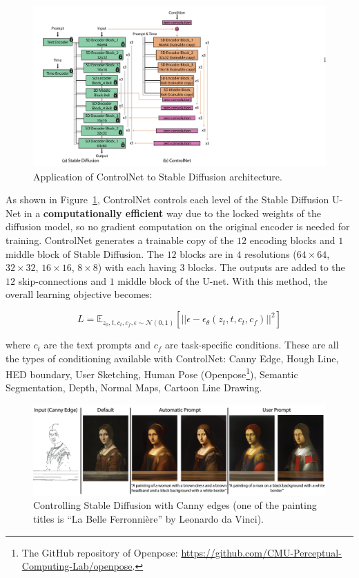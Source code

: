 \documentclass[preprint]{elsarticle}
\begin{document}
\begin{figure}[t]
	\centering
    \includegraphics[scale=0.8]{img/svg/Controlnet2.png}
	\caption{Application of ControlNet to Stable Diffusion architecture.}\label{fig:controlnet-2}
\end{figure}


As shown in Figure~\ref{fig:controlnet-2}, ControlNet controls each level of the Stable Diffusion U-Net in a \textbf{computationally efficient} way due to the locked weights of the diffusion model, so no gradient computation on the original encoder is needed for training. 
ControlNet generates a trainable copy of the $12$ encoding blocks and $1$ middle block of Stable Diffusion. The $12$ blocks are in $4$ resolutions ($64 \times 64$, $32 \times 32$, $16 \times 16$, $8 \times 8$) with each having $3$ blocks. The outputs are added to the $12$ skip-connections and $1$ middle block of the U-net. With this method, the overall learning objective becomes:

\begin{equation}
	L = \mathbb{E}_{z_0,t,c_t,c_f,\epsilon \sim \mathcal{N}(0,1)}\left[||\epsilon-\epsilon_\theta(z_t,t,c_t,c_f)||^2 \right]
\end{equation}

\noindent where $c_t$ are the text prompts and $c_f$ are task-specific conditions. These are all the types of conditioning available with ControlNet: Canny Edge, Hough Line, HED boundary, User Sketching, Human Pose (Openpose\footnote{The GitHub repository of Openpose: \url{https://github.com/CMU-Perceptual-Computing-Lab/openpose}.}), Semantic Segmentation, Depth, Normal Maps, Cartoon Line Drawing.


\begin{figure}[t]
	\centering
	\includegraphics[scale=0.8]{img/background_img/ControlnetDemo.png}
	\caption{Controlling Stable Diffusion with Canny edges (one of the painting titles is ``La Belle Ferronni{\`e}re'' by Leonardo da Vinci).}
	\label{fig:canny}
\end{figure}
\end{document}

